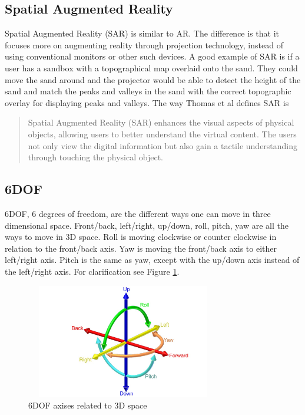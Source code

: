 \documentclass{sig-alternate}
\begin{document}
\subsection{Spatial Augmented Reality}
\label{sec:Spatial Augmented Reality}
Spatial Augmented Reality (SAR) is similar to AR. The difference is that it focuses more on augmenting reality through projection technology, instead of using conventional monitors or other such devices. A good example of SAR is if a user has a sandbox with a topographical map overlaid onto the sand. They could move the sand around and the projector would be able to detect the height of the sand and match the peaks and valleys in the sand with the correct topographic overlay for displaying peaks and valleys. The way Thomas et al \cite{3D} defines SAR is 
\begin{quote}
Spatial Augmented Reality (SAR) enhances the visual aspects of physical objects, allowing users to better understand the virtual content. The users not only view the digital information but also gain a tactile understanding through touching the physical object.
\end{quote}

\subsection{6DOF}
\label{sec:6DOF}
6DOF, 6 degrees of freedom, are the different ways one can move in three dimensional space. Front/back, left/right, up/down, roll, pitch, yaw are all the ways to move in 3D space. Roll is moving clockwise or counter clockwise in relation to the front/back axis. Yaw is moving the front/back axis to either left/right axis. Pitch is the same as yaw, except with the up/down axis instead of the left/right axis. For clarification see Figure \ref{fig:6DOF}.

\begin{figure}
	\includegraphics[width=8.5cm, height=5cm]{6DOF_en}
	\caption{6DOF axises related to 3D space \cite{6DOF}}
	\label{fig:6DOF}
\end{figure}  
\end{document}

